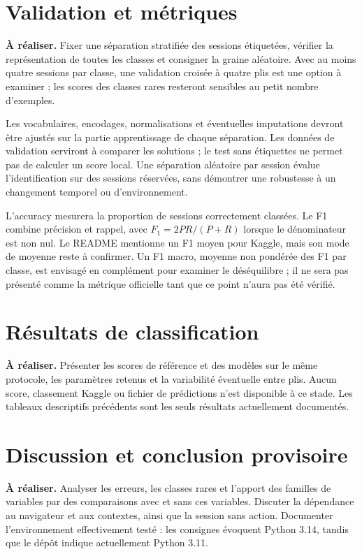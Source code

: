 \documentclass[10pt,a4paper]{article}
\newcommand{\afaire}[1]{\par\smallskip\textcolor{accent}{\textbf{À réaliser.}} #1\par}
\begin{document}
\section{Validation et métriques}
\afaire{Fixer une séparation stratifiée des sessions étiquetées, vérifier
la représentation de toutes les classes et consigner la graine aléatoire.
Avec au moins quatre sessions par classe, une validation croisée à quatre
plis est une option à examiner ; les scores des classes rares resteront
sensibles au petit nombre d'exemples.}

Les vocabulaires, encodages, normalisations et éventuelles imputations
devront être ajustés sur la partie apprentissage de chaque séparation.
Les données de validation serviront à comparer les solutions ; le test
sans étiquettes ne permet pas de calculer un score local. Une séparation
aléatoire par session évalue l'identification sur des sessions réservées,
sans démontrer une robustesse à un changement temporel ou d'environnement.

L'accuracy mesurera la proportion de sessions correctement classées.
Le F1 combine précision et rappel, avec $F_1=2PR/(P+R)$ lorsque le
dénominateur est non nul. Le README mentionne un F1 moyen pour Kaggle,
mais son mode de moyenne reste à confirmer. Un F1 macro, moyenne non
pondérée des F1 par classe, est envisagé en complément pour examiner
le déséquilibre ; il ne sera pas présenté comme la métrique officielle
tant que ce point n'aura pas été vérifié.

\section{Résultats de classification}
\afaire{Présenter les scores de référence et des modèles sur le même
protocole, les paramètres retenus et la variabilité éventuelle entre plis.
Aucun score, classement Kaggle ou fichier de prédictions n'est disponible
à ce stade. Les tableaux descriptifs précédents sont les seuls résultats
actuellement documentés.}

\section{Discussion et conclusion provisoire}
\afaire{Analyser les erreurs, les classes rares et l'apport des familles
de variables par des comparaisons avec et sans ces variables. Discuter
la dépendance au navigateur et aux contextes, ainsi que la session sans
action. Documenter l'environnement effectivement testé : les consignes
évoquent Python 3.14, tandis que le dépôt indique actuellement Python 3.11.}
\end{document}
